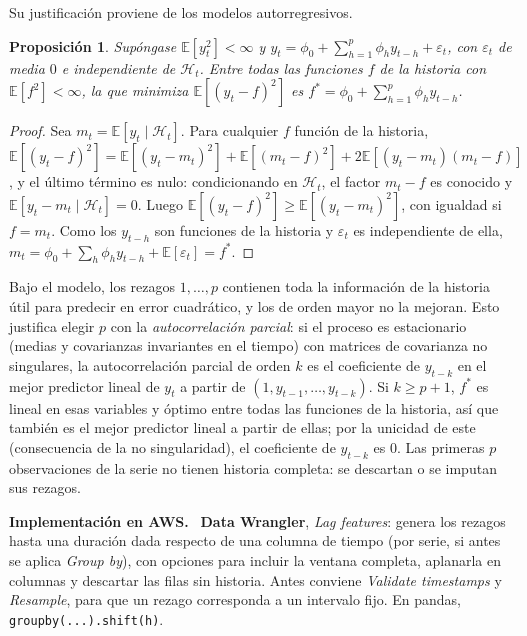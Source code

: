 \documentclass[11pt,a4paper]{article}
\theoremstyle{plain}
\newtheorem{proposicion}[teorema]{Proposición}
\theoremstyle{definition}
\theoremstyle{remark}
\newcommand{\E}{\mathbb{E}}
\newcommand{\1}{\mathbf{1}}
\newenvironment{aws}{\par\medskip\sloppy\noindent\textbf{Implementación en AWS.}\ }{\par\medskip}
\begin{document}
Su justificación proviene de los modelos autorregresivos.

\begin{proposicion}\label{prop:ar}
Supóngase $\E[y_t^2]<\infty$ y
$y_t=\phi_0+\sum_{h=1}^p\phi_hy_{t-h}+\varepsilon_t$, con $\varepsilon_t$
de media $0$ e independiente de $\mathcal H_t$. Entre todas las funciones
$f$ de la historia con $\E[f^2]<\infty$, la que minimiza
$\E[(y_t-f)^2]$ es $f^*=\phi_0+\sum_{h=1}^p\phi_hy_{t-h}$.
\end{proposicion}

\begin{proof}
Sea $m_t=\E[y_t\mid\mathcal H_t]$. Para cualquier $f$ función de la
historia,
$\E[(y_t-f)^2]=\E[(y_t-m_t)^2]+\E[(m_t-f)^2]+2\E[(y_t-m_t)(m_t-f)]$, y el
último término es nulo: condicionando en $\mathcal H_t$, el factor
$m_t-f$ es conocido y $\E[y_t-m_t\mid\mathcal H_t]=0$. Luego
$\E[(y_t-f)^2]\ge\E[(y_t-m_t)^2]$, con igualdad si $f=m_t$. Como los
$y_{t-h}$ son funciones de la historia y $\varepsilon_t$ es independiente
de ella,
$m_t=\phi_0+\sum_h\phi_hy_{t-h}+\E[\varepsilon_t]=f^*$.
\end{proof}

Bajo el modelo, los rezagos $1,\dots,p$ contienen toda la información de
la historia útil para predecir en error cuadrático, y los de orden mayor
no la mejoran. Esto justifica elegir $p$ con la \emph{autocorrelación
parcial}: si el proceso es estacionario (medias y covarianzas invariantes
en el tiempo) con matrices de covarianza no singulares, la autocorrelación
parcial de orden $k$ es el coeficiente de $y_{t-k}$ en el mejor predictor
lineal de $y_t$ a partir de $(1,y_{t-1},\dots,y_{t-k})$. Si $k\ge p+1$,
$f^*$ es lineal en esas variables y óptimo entre todas las funciones de la
historia, así que también es el mejor predictor lineal a partir de ellas;
por la unicidad de este (consecuencia de la no singularidad), el
coeficiente de $y_{t-k}$ es $0$. Las primeras $p$ observaciones de la
serie no tienen historia completa: se descartan o se imputan sus rezagos.

\begin{aws}
\textbf{Data Wrangler}, \emph{Lag features}: genera los rezagos hasta una
duración dada respecto de una columna de tiempo (por serie, si antes se
aplica \emph{Group by}), con opciones para incluir la ventana completa,
aplanarla en columnas y descartar las filas sin historia. Antes conviene
\emph{Validate timestamps} y \emph{Resample}, para que un rezago
corresponda a un intervalo fijo. En pandas,
\texttt{groupby(...).shift(h)}.
\end{aws}
\end{document}
